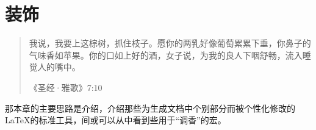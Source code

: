 \chapter{装饰}

\begin{quote}
    我说，我要上这棕树，抓住枝子。愿你的两乳好像葡萄累累下垂，你鼻子的气味香如苹果。你的口如上好的酒，女子说，为我的良人下咽舒畅，流入睡觉人的嘴中。

    \hfill《圣经·雅歌》7:10
\end{quote}

那本章的主要思路是介绍，介绍那些为生成文档中个别部分而被个性化修改的\LaTeX 的标准工具，间或可以从中看到些用于“调香”的宏。